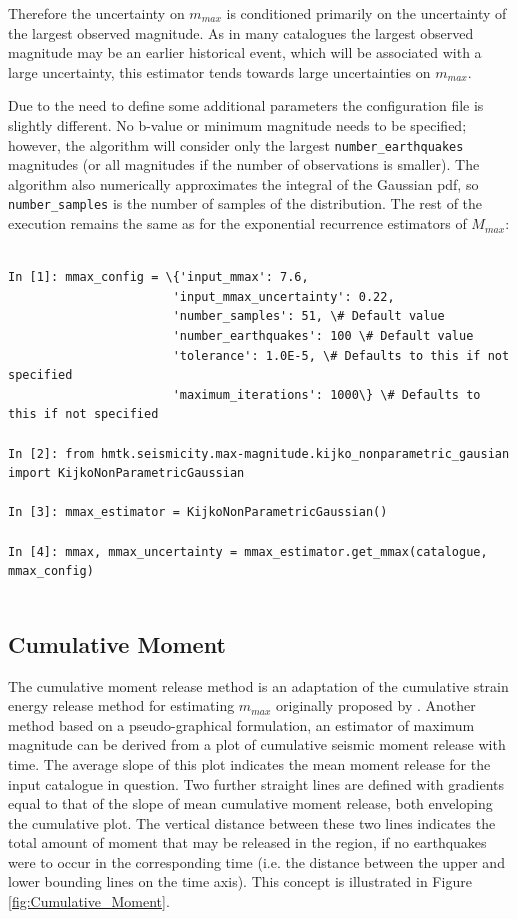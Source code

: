 Therefore the uncertainty on $m_{max}$ is conditioned primarily on the uncertainty of the largest observed magnitude. As in many catalogues the largest observed magnitude may be an earlier historical event, which will be associated with a large uncertainty, this estimator tends towards large uncertainties on $m_{max}$.

Due to the need to define some additional parameters the configuration file is slightly different. No b-value or minimum magnitude needs to be specified; however, the algorithm will consider only the largest \verb=number_earthquakes= magnitudes (or all magnitudes if the number of observations is smaller). The algorithm also numerically approximates the integral of the Gaussian pdf, so \verb=number_samples= is the number of samples of the distribution. The rest of the execution remains the same as for the exponential recurrence estimators of $M_{max}$:

\begin{Verbatim}[frame=single, commandchars=\\\{\}, fontsize=\scriptsize]

In [1]: mmax_config = \{'input_mmax': 7.6,
                       'input_mmax_uncertainty': 0.22,
                       'number_samples': 51, \# Default value
                       'number_earthquakes': 100 \# Default value
                       'tolerance': 1.0E-5, \# Defaults to this if not specified
                       'maximum_iterations': 1000\} \# Defaults to this if not specified
                       
In [2]: from hmtk.seismicity.max-magnitude.kijko_nonparametric_gausian import KijkoNonParametricGaussian

In [3]: mmax_estimator = KijkoNonParametricGaussian()

In [4]: mmax, mmax_uncertainty = mmax_estimator.get_mmax(catalogue, mmax_config)
                
\end{Verbatim}


\subsection{Cumulative Moment\citep{MakropoulosBurton1983}}

The cumulative moment release method is an adaptation of the cumulative strain energy release method for estimating $m_{max}$ originally proposed by \cite{MakropoulosBurton1983}. Another method based on a pseudo-graphical formulation, an estimator of maximum magnitude can be derived from a plot of cumulative seismic moment release with time. The average slope of this plot indicates the mean moment release for the input catalogue in question. Two further straight lines are defined with gradients equal to that of the slope of mean cumulative moment release, both enveloping the cumulative plot. The vertical distance between these two lines indicates the total amount of moment that may be released in the region, if no earthquakes were to occur in the corresponding time (i.e. the distance between the upper and lower bounding lines on the time axis). This concept is illustrated in Figure \ref{fig:Cumulative_Moment}. 

